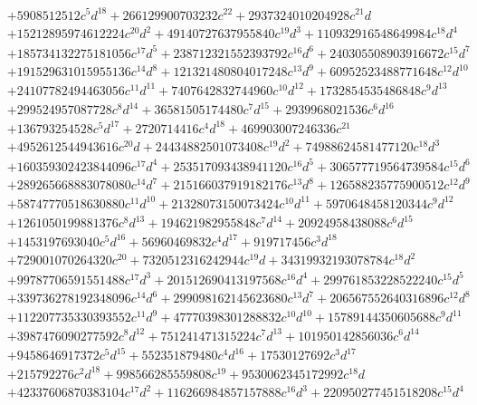 {\begin{align*}
&+5908512512c^{5}d^{18}+266129900703232c^{22}+2937324010204928c^{21}d\\
&+15212895974612224c^{20}d^{2}+49140727637955840c^{19}d^{3}+110932916548649984c^{18}d^{4}\\
&+185734132275181056c^{17}d^{5}+238712321552393792c^{16}d^{6}+240305508903916672c^{15}d^{7}\\
&+191529631015955136c^{14}d^{8}+121321480804017248c^{13}d^{9}+60952523488771648c^{12}d^{10}\\
&+24107782494463056c^{11}d^{11}+7407642832744960c^{10}d^{12}+1732854535486848c^{9}d^{13}\\
&+299524957087728c^{8}d^{14}+36581505174480c^{7}d^{15}+2939968021536c^{6}d^{16}\\
&+136793254528c^{5}d^{17}+2720714416c^{4}d^{18}+469903007246336c^{21}\\
&+4952612544943616c^{20}d+24434882501073408c^{19}d^{2}+74988624581477120c^{18}d^{3}\\
&+160359302423844096c^{17}d^{4}+253517093438941120c^{16}d^{5}+306577719564739584c^{15}d^{6}\\
&+289265668883078080c^{14}d^{7}+215166037919182176c^{13}d^{8}+126588235775900512c^{12}d^{9}\\
&+58747770518630880c^{11}d^{10}+21328073150073424c^{10}d^{11}+5970648458120344c^{9}d^{12}\\
&+1261050199881376c^{8}d^{13}+194621982955848c^{7}d^{14}+20924958438088c^{6}d^{15}\\
&+1453197693040c^{5}d^{16}+56960469832c^{4}d^{17}+919717456c^{3}d^{18}\\
&+729001070264320c^{20}+7320512316242944c^{19}d+34319932193078784c^{18}d^{2}\\
&+99787706591551488c^{17}d^{3}+201512690413197568c^{16}d^{4}+299761853228522240c^{15}d^{5}\\
&+339736278192348096c^{14}d^{6}+299098162145623680c^{13}d^{7}+206567552640316896c^{12}d^{8}\\
&+112207735330393552c^{11}d^{9}+47770398301288832c^{10}d^{10}+15789144350605688c^{9}d^{11}\\
&+3987476090277592c^{8}d^{12}+751241471315224c^{7}d^{13}+101950142856036c^{6}d^{14}\\
&+9458646917372c^{5}d^{15}+552351879480c^{4}d^{16}+17530127692c^{3}d^{17}\\
&+215792276c^{2}d^{18}+998566285559808c^{19}+9530062345172992c^{18}d\\
&+42337606870383104c^{17}d^{2}+116266984857157888c^{16}d^{3}+220950277451518208c^{15}d^{4}\\

\end{align*}}
